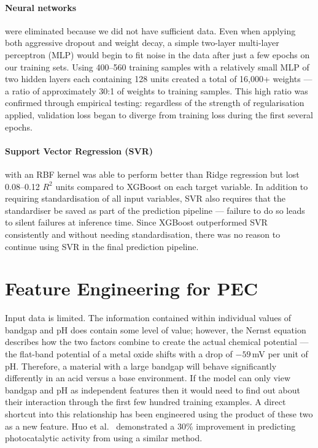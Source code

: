 \paragraph{Neural networks} were eliminated because we did not have sufficient data.
Even when applying both aggressive dropout and weight decay, a simple two-layer
multi-layer perceptron (MLP) would begin to fit noise in the data after just a few
epochs on our training sets.
Using 400--560 training samples with a relatively small MLP of two hidden layers
each containing 128 units created a total of 16,000+ weights --- a ratio of
approximately 30:1 of weights to training samples.
This high ratio was confirmed through empirical testing: regardless of the strength
of regularisation applied, validation loss began to diverge from training loss
during the first several epochs.

\paragraph{Support Vector Regression (SVR)} with an RBF kernel was able to perform
better than Ridge regression but lost 0.08--0.12 $R^2$ units compared to XGBoost
on each target variable.
In addition to requiring standardisation of all input variables, SVR also requires
that the standardiser be saved as part of the prediction pipeline --- failure to do
so leads to silent failures at inference time.
Since XGBoost outperformed SVR consistently and without needing standardisation,
there was no reason to continue using SVR in the final prediction pipeline.

\section{Feature Engineering for PEC}

Input data is limited.
The information contained within individual values of bandgap and pH does contain
some level of value; however, the Nernst equation describes how the two factors
combine to create the actual chemical potential --- the flat-band potential of a
metal oxide shifts with a drop of $-59$\,mV per unit of pH.
Therefore, a material with a large bandgap will behave significantly differently
in an acid versus a base environment.
If the model can only view bandgap and pH as independent features then it would
need to find out about their interaction through the first few hundred training
examples.
A direct shortcut into this relationship has been engineered using the product of
these two as a new feature.
Huo et al.~\cite{huo2019unified} demonstrated a 30\% improvement in predicting
photocatalytic activity from using a similar method.

